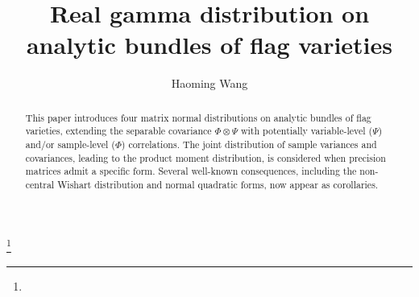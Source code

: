 \documentclass{amsart}
\theoremstyle{definition}
\numberwithin{equation}{section}
\begin{document}
\title[Real gamma distribution on analytic bundles]{Real gamma distribution on analytic bundles of flag varieties}
\author[Haoming Wang]{Haoming Wang}
\address{Center for Combinatorics, Nankai University, Tientsin {\rm300071}, China}
\thanks{}
\date{}
\dedicatory{}


\begin{abstract}
This paper introduces four matrix normal distributions on analytic bundles of flag varieties, extending the separable covariance $\varPhi \otimes \varPsi$ with potentially variable-level ($\varPsi$) and/or sample-level ($\varPhi$) correlations. The joint distribution of sample variances and covariances, leading to the product moment distribution, is considered when precision matrices admit a specific form. Several well-known consequences, including the non-central Wishart distribution and normal quadratic forms, now appear as corollaries.
\end{abstract}
\end{document}
